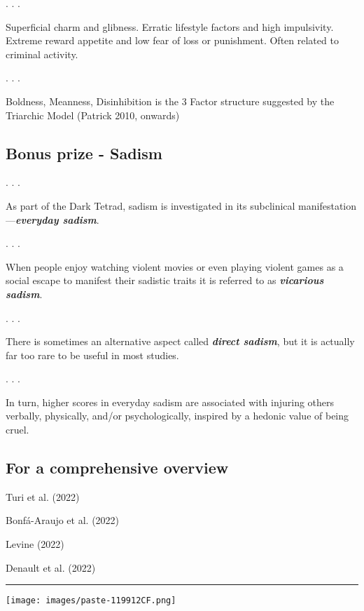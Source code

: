 \documentclass[
  letterpaper,
  DIV=11,
  numbers=noendperiod]{scrartcl}
\begin{document}
. . .

\hfill\break
Superficial charm and glibness. Erratic lifestyle factors and high
impulsivity. Extreme reward appetite and low fear of loss or punishment.
Often related to criminal activity.

. . .

\hfill\break
Boldness, Meanness, Disinhibition is the 3 Factor structure suggested by
the Triarchic Model (Patrick 2010, onwards)

\hypertarget{bonus-prize---sadism}{%
\subsection{Bonus prize - Sadism}\label{bonus-prize---sadism}}

. . .

As part of the Dark Tetrad, sadism is investigated in its subclinical
manifestation---\textbf{\emph{everyday sadism}}.

. . .

\hfill\break
When people enjoy watching violent movies or even playing violent games
as a social escape to manifest their sadistic traits it is referred to
as \textbf{\emph{vicarious sadism}}.

. . .

\hfill\break
There is sometimes an alternative aspect called \textbf{\emph{direct
sadism}}, but it is actually far too rare to be useful in most studies.

. . .

\hfill\break
In turn, higher scores in everyday sadism are associated with injuring
others verbally, physically, and/or psychologically, inspired by a
hedonic value of being cruel.

\hypertarget{for-a-comprehensive-overview}{%
\subsection{For a comprehensive
overview}\label{for-a-comprehensive-overview}}

Turi et al. (2022)

Bonfá-Araujo et al. (2022)

Levine (2022)

Denault et al. (2022)

\begin{center}\rule{0.5\linewidth}{0.5pt}\end{center}

\texttt{[image: images/paste-119912CF.png]}
\end{document}

